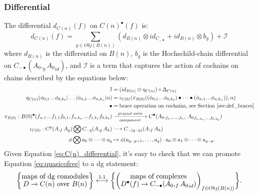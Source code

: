 \subsubsection{Differential}
The differential $d_{C(n)}(f)$ on $C(n)^\bullet(f)$ is: 
%
\begin{equation} \label{eq:C(n)_differential}
d_{C(n)}(f) = 
\sum\limits_{g \in Obj(B(n))} 
(d_{B(n)} \otimes id_{C_{-\bullet}}
+ id_{ B(n)}\otimes b_g)
+ \mathcal{I}
\end{equation}
%
where $d_{B(n)}$ is the differential on $B(n)$, 
$b_g$ is the Hochschild-chain differential on 
$C_{-\bullet}(A_0, _g{A_0}_{id})$, 
and $\mathcal{I}$ is a term that captures the action of cochains on chains 
described by the equations below:
%
\begin{equation}\label{eq:action_term}
\begin{split}
\mathcal{I} 
&= 
(id_{B(n)} \otimes \eta_{C(n)})
  \circ \Delta_{C(n)}\\
\eta_{C(n)}(
\phi_{0,1}\smdots\phi_{0,k_0} | \dots |
\phi_{n,1}\smdots\phi_{n,k_n} | \alpha)
&= 
\iota_{C(0)}( \pi_{B(0)}( 
(\phi_{0,1}\smdots \phi_{0,k_0}) \bullet \dots \bullet
(\phi_{n,1}\smdots \phi_{n,k_n})), \alpha)\\
\bullet
&= 
\textrm{brace operation on cochains, 
  see Section \ref{sec:def_braces}}\\
\pi_{B(0)}: 
B(0)^\bullet
(f_{n,1}\smdots f_{1,1} f_{0,1}, 
f_{n,k_n}\smdots f_{1,k_1} f_{0,k_0})
&\xrightarrow[component]{project\;onto}
C^\bullet(A_0, _{f_{n,1}\smdots f_{0,1}}{A_0}_{f_{n,k_n}\smdots f_{0,k_0}})\\
\iota_{C(0)}: C^p(A, _fA_g) \bigotimes C_{-q}(A, _gA_h) 
&\longrightarrow 
C_{-(q-p)}(A, _fA_h) \\
\phi \bigotimes a_0\otimes \dots \otimes a_q 
&\mapsto 
\phi(a_{q-p+1},\dots,a_q)\cdot a_0 
\otimes a_1 \otimes \dots \otimes a_{q-p}.
\end{split}
\end{equation}
%
Given Equation \ref{eq:C(n)_differential}, 
it's easy to check that we can promote 
Equation \ref{eq:quasicofree} to a dg statement:
%
\begin{equation*}
\bigg\{ \let\scriptstyle\textstyle
\substack{\textrm{maps of dg comodules}\\
  D \to C(n)\textrm{ over }B(n)} 
\bigg\}
\overset{1:1}{\longleftrightarrow}
\bigg\{ \bigg( \let\scriptstyle\textstyle
\substack{\textrm{maps of complexes}\\
  D^\bullet(f) \to C_{-\bullet}(A_0, _f{A_0}_{id})}
\bigg)_{f \in Obj(B(n))} \bigg\}.
\end{equation*}